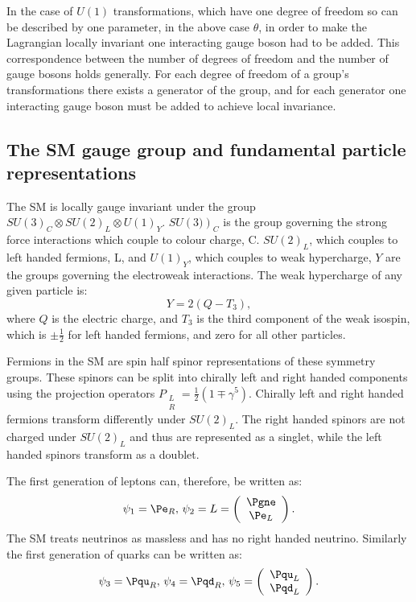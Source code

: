 In the case of $U(1)$ transformations, which have one degree of freedom so can be described by one parameter, in the above case $\theta$, in order to make the Lagrangian locally invariant one interacting gauge boson had to be added. This correspondence between the number of degrees of freedom and the number of gauge bosons holds generally. For each degree of freedom of a group's transformations there exists a generator of the group, and for each generator one interacting gauge boson must be added to achieve local invariance.

\subsection{The SM gauge group and fundamental particle representations}
\label{sec:smgauge}
The \ac{SM} is locally gauge invariant under the group $SU\left(3\right)_{C}\otimes SU\left(2\right)_{L}\otimes U\left(1\right)_{Y}$. $SU\left(3)\right)_{C}$ is the group governing the strong force interactions which couple to colour charge, C. $SU\left(2\right)_{L}$, which couples to left handed fermions, L, and $U\left(1\right)_{Y}$, which couples to weak hypercharge, $Y$ are the groups governing the electroweak interactions. The weak hypercharge of any given particle is:
\begin{equation}
  Y=2(Q-T_{3}),
\end{equation}
where $Q$ is the electric charge, and $T_{3}$ is the third component of the weak isospin, which is $\pm\frac{1}{2}$ for left handed fermions, and zero for all other particles.

 Fermions in the SM are spin half spinor representations of these symmetry groups. These spinors can be split into chirally left and right handed components using the projection operators $P_{\substack{L \\R}}=\frac{1}{2}(1\mp \gamma^{5})$. Chirally left and right handed fermions transform differently under $SU\left(2\right)_{L}$. The right handed spinors are not charged under $SU\left(2\right)_{L}$ and thus are represented as a singlet, while the left handed spinors transform as a doublet.

The first generation of leptons can, therefore, be written as:
\begin{equation}
  \psi_{1}=\Pe_{R},\,\psi_{2}=L=\left(\begin{array}{c} \Pgne \\ \Pe_{L}\end{array}\right).
\end{equation}
The SM treats neutrinos as massless and has no right handed neutrino. Similarly the first generation of quarks can be written as:
\begin{equation}
  \psi_{3}=\Pqu_{R},\,\psi_{4}=\Pqd_{R},\,\psi_{5}=\left(\begin{array}{c} \Pqu_{L} \\ \Pqd_{L}\end{array}\right).
\end{equation}

